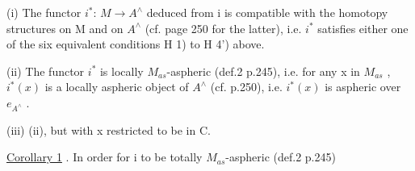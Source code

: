 (i) The functor $i^{*}$: $M \to A^{\wedge}$ deduced from i is compatible with the
homotopy structures on M and on $A^{\wedge}$ (cf. page 250 for the latter), i.e.
$i^{*}$ satisfies ei\hand{$\downarrow$}ther one of the six equivalent conditions H 1) to H 4')
above.

(ii) The functor $i^{*}$ is locally $M_{as}$-aspheric (def.2 p.245), i.e.
for any x in $M_{as}$ , $i^{*}(x)$ is a locally aspheric object of $A^{\wedge}$ (cf. p.250),
i.e. $i^{*}(x)$ is aspheric over $e_{A^{\wedge}}$ .

(iii)  (ii), but with x restricted to be in C.

\uline{Corollary 1} . In order for i to be totally $M_{as}$-aspheric (def.2 p.245)

